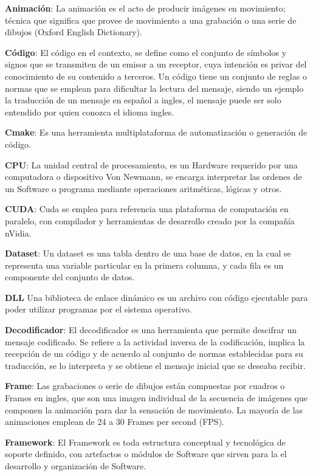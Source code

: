 \textbf{Animación}: La animación es el acto de producir imágenes en movimiento; técnica que significa que provee de movimiento a una grabación o una serie de dibujos (Oxford English Dictionary). 

\textbf{Código}: El código en el contexto, se define como el conjunto de símbolos y signos que se transmiten de un emisor a un receptor, cuya intención es privar del conocimiento de su contenido a terceros. Un código tiene un conjunto de reglas o normas que se emplean para dificultar la lectura del mensaje, siendo un ejemplo la traducción de un mensaje en español a ingles, el mensaje puede ser solo entendido por quien conozca el idioma ingles.

\textbf{Cmake}: Es una herramienta multiplataforma de automatización o generación de código.

\textbf{CPU}: La unidad central de procesamiento, es un Hardware requerido por una computadora o dispositivo Von Newmann, se encarga interpretar las ordenes de un Software o programa mediante operaciones aritméticas, lógicas y otros.

\textbf{CUDA}: Cuda se emplea para referencia una plataforma de computación en paralelo, con compilador y herramientas de desarrollo creado por la compañía nVidia.

\textbf{Dataset}: Un dataset es una tabla dentro de una base de datos, en la cual se representa una variable particular en la primera columna, y cada fila es un componente del conjunto de datos.

\textbf{DLL} Una biblioteca de enlace dinámico es un archivo con código ejecutable para poder utilizar programas por el sistema operativo.

\textbf{Decodificador}: El decodificador es una herramienta que permite descifrar un mensaje codificado. Se refiere a la actividad inversa de la codificación, implica la recepción de un código y de acuerdo al conjunto de normas establecidas para su traducción, se lo interpreta y se obtiene el mensaje inicial que se deseaba recibir.

\textbf{Frame}: Las grabaciones o serie de dibujos están compuestas por cuadros o Frames en ingles, que son una imagen individual de la secuencia de imágenes que componen la animación para dar la sensación de movimiento. La mayoría de las animaciones emplean de 24 a 30 Frames per second (FPS). 

\textbf{Framework}: El Framework es toda estructura conceptual y tecnológica de soporte definido, con artefactos o módulos de Software que sirven para la el desarrollo y organización de Software.

